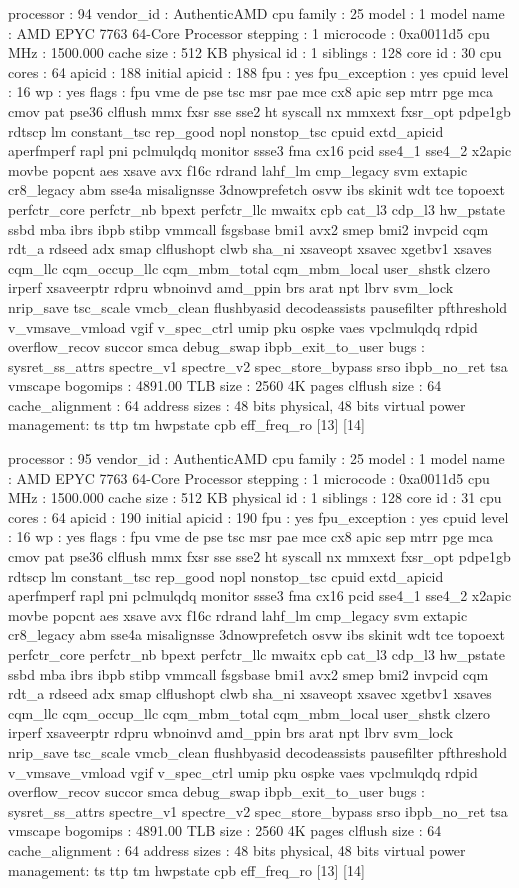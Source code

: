 processor	: 94
vendor_id	: AuthenticAMD
cpu family	: 25
model		: 1
model name	: AMD EPYC 7763 64-Core Processor
stepping	: 1
microcode	: 0xa0011d5
cpu MHz		: 1500.000
cache size	: 512 KB
physical id	: 1
siblings	: 128
core id		: 30
cpu cores	: 64
apicid		: 188
initial apicid	: 188
fpu		: yes
fpu_exception	: yes
cpuid level	: 16
wp		: yes
flags		: fpu vme de pse tsc msr pae mce cx8 apic sep mtrr pge mca cmov pat pse36 clflush mmx fxsr sse sse2 ht syscall nx mmxext fxsr_opt pdpe1gb rdtscp lm constant_tsc rep_good nopl nonstop_tsc cpuid extd_apicid aperfmperf rapl pni pclmulqdq monitor ssse3 fma cx16 pcid sse4_1 sse4_2 x2apic movbe popcnt aes xsave avx f16c rdrand lahf_lm cmp_legacy svm extapic cr8_legacy abm sse4a misalignsse 3dnowprefetch osvw ibs skinit wdt tce topoext perfctr_core perfctr_nb bpext perfctr_llc mwaitx cpb cat_l3 cdp_l3 hw_pstate ssbd mba ibrs ibpb stibp vmmcall fsgsbase bmi1 avx2 smep bmi2 invpcid cqm rdt_a rdseed adx smap clflushopt clwb sha_ni xsaveopt xsavec xgetbv1 xsaves cqm_llc cqm_occup_llc cqm_mbm_total cqm_mbm_local user_shstk clzero irperf xsaveerptr rdpru wbnoinvd amd_ppin brs arat npt lbrv svm_lock nrip_save tsc_scale vmcb_clean flushbyasid decodeassists pausefilter pfthreshold v_vmsave_vmload vgif v_spec_ctrl umip pku ospke vaes vpclmulqdq rdpid overflow_recov succor smca debug_swap ibpb_exit_to_user
bugs		: sysret_ss_attrs spectre_v1 spectre_v2 spec_store_bypass srso ibpb_no_ret tsa vmscape
bogomips	: 4891.00
TLB size	: 2560 4K pages
clflush size	: 64
cache_alignment	: 64
address sizes	: 48 bits physical, 48 bits virtual
power management: ts ttp tm hwpstate cpb eff_freq_ro [13] [14]

processor	: 95
vendor_id	: AuthenticAMD
cpu family	: 25
model		: 1
model name	: AMD EPYC 7763 64-Core Processor
stepping	: 1
microcode	: 0xa0011d5
cpu MHz		: 1500.000
cache size	: 512 KB
physical id	: 1
siblings	: 128
core id		: 31
cpu cores	: 64
apicid		: 190
initial apicid	: 190
fpu		: yes
fpu_exception	: yes
cpuid level	: 16
wp		: yes
flags		: fpu vme de pse tsc msr pae mce cx8 apic sep mtrr pge mca cmov pat pse36 clflush mmx fxsr sse sse2 ht syscall nx mmxext fxsr_opt pdpe1gb rdtscp lm constant_tsc rep_good nopl nonstop_tsc cpuid extd_apicid aperfmperf rapl pni pclmulqdq monitor ssse3 fma cx16 pcid sse4_1 sse4_2 x2apic movbe popcnt aes xsave avx f16c rdrand lahf_lm cmp_legacy svm extapic cr8_legacy abm sse4a misalignsse 3dnowprefetch osvw ibs skinit wdt tce topoext perfctr_core perfctr_nb bpext perfctr_llc mwaitx cpb cat_l3 cdp_l3 hw_pstate ssbd mba ibrs ibpb stibp vmmcall fsgsbase bmi1 avx2 smep bmi2 invpcid cqm rdt_a rdseed adx smap clflushopt clwb sha_ni xsaveopt xsavec xgetbv1 xsaves cqm_llc cqm_occup_llc cqm_mbm_total cqm_mbm_local user_shstk clzero irperf xsaveerptr rdpru wbnoinvd amd_ppin brs arat npt lbrv svm_lock nrip_save tsc_scale vmcb_clean flushbyasid decodeassists pausefilter pfthreshold v_vmsave_vmload vgif v_spec_ctrl umip pku ospke vaes vpclmulqdq rdpid overflow_recov succor smca debug_swap ibpb_exit_to_user
bugs		: sysret_ss_attrs spectre_v1 spectre_v2 spec_store_bypass srso ibpb_no_ret tsa vmscape
bogomips	: 4891.00
TLB size	: 2560 4K pages
clflush size	: 64
cache_alignment	: 64
address sizes	: 48 bits physical, 48 bits virtual
power management: ts ttp tm hwpstate cpb eff_freq_ro [13] [14]

